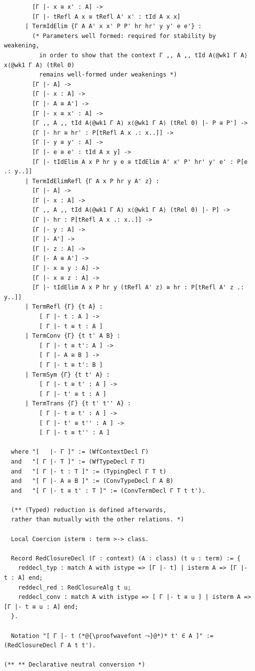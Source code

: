 \begin{lstlisting}
        [Γ |- x ≅ x' : A] ->
        [Γ |- tRefl A x ≅ tRefl A' x' : tId A x x]
      | TermIdElim {Γ A A' x x' P P' hr hr' y y' e e'} :
        (* Parameters well formed: required for stability by weakening,
          in order to show that the context Γ ,, A ,, tId A⟨@wk1 Γ A⟩ x⟨@wk1 Γ A⟩ (tRel 0)
          remains well-formed under weakenings *)
        [Γ |- A] ->
        [Γ |- x : A] ->
        [Γ |- A ≅ A'] ->
        [Γ |- x ≅ x' : A] ->
        [Γ ,, A ,, tId A⟨@wk1 Γ A⟩ x⟨@wk1 Γ A⟩ (tRel 0) |- P ≅ P'] ->
        [Γ |- hr ≅ hr' : P[tRefl A x .: x..]] ->
        [Γ |- y ≅ y' : A] ->
        [Γ |- e ≅ e' : tId A x y] ->
        [Γ |- tIdElim A x P hr y e ≅ tIdElim A' x' P' hr' y' e' : P[e .: y..]]
      | TermIdElimRefl {Γ A x P hr y A' z} :
        [Γ |- A] ->
        [Γ |- x : A] ->
        [Γ ,, A ,, tId A⟨@wk1 Γ A⟩ x⟨@wk1 Γ A⟩ (tRel 0) |- P] ->
        [Γ |- hr : P[tRefl A x .: x..]] ->
        [Γ |- y : A] ->
        [Γ |- A'] ->
        [Γ |- z : A] ->
        [Γ |- A ≅ A'] ->
        [Γ |- x ≅ y : A] ->
        [Γ |- x ≅ z : A] ->
        [Γ |- tIdElim A x P hr y (tRefl A' z) ≅ hr : P[tRefl A' z .: y..]]
      | TermRefl {Γ} {t A} :
          [ Γ |- t : A ] -> 
          [ Γ |- t ≅ t : A ]
      | TermConv {Γ} {t t' A B} :
          [ Γ |- t ≅ t': A ] ->
          [ Γ |- A ≅ B ] ->
          [ Γ |- t ≅ t': B ]
      | TermSym {Γ} {t t' A} :
          [ Γ |- t ≅ t' : A ] ->
          [ Γ |- t' ≅ t : A ]
      | TermTrans {Γ} {t t' t'' A} :
          [ Γ |- t ≅ t' : A ] ->
          [ Γ |- t' ≅ t'' : A ] ->
          [ Γ |- t ≅ t'' : A ]
      
  where "[   |- Γ ]" := (WfContextDecl Γ)
  and   "[ Γ |- T ]" := (WfTypeDecl Γ T)
  and   "[ Γ |- t : T ]" := (TypingDecl Γ T t)
  and   "[ Γ |- A ≅ B ]" := (ConvTypeDecl Γ A B)
  and   "[ Γ |- t ≅ t' : T ]" := (ConvTermDecl Γ T t t').

  (** (Typed) reduction is defined afterwards,
  rather than mutually with the other relations. *)

  Local Coercion isterm : term >-> class.

  Record RedClosureDecl (Γ : context) (A : class) (t u : term) := {
    reddecl_typ : match A with istype => [Γ |- t] | isterm A => [Γ |- t : A] end;
    reddecl_red : RedClosureAlg t u;
    reddecl_conv : match A with istype => [ Γ |- t ≅ u ] | isterm A => [Γ |- t ≅ u : A] end;
  }.

  Notation "[ Γ |- t (*@{\proofwavefont ⤳}@*)* t' ∈ A ]" := (RedClosureDecl Γ A t t').

(** ** Declarative neutral conversion *)


\end{lstlisting}
